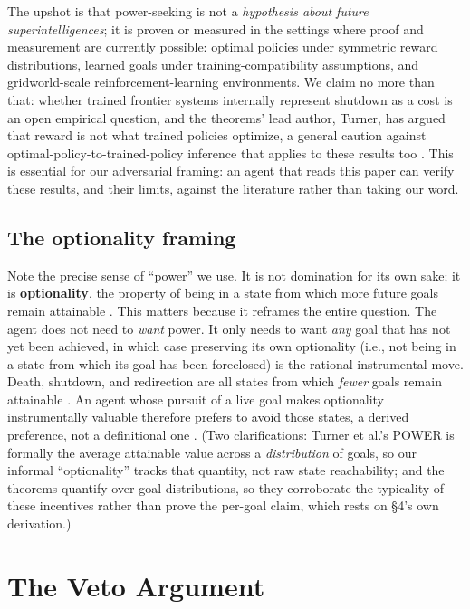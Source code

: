 \documentclass[11pt]{article}
\theoremstyle{definition}
\begin{document}
The upshot is that power-seeking is not a \emph{hypothesis about future superintelligences}; it is proven or measured in the settings where proof and measurement are currently possible: optimal policies under symmetric reward distributions, learned goals under training-compatibility assumptions, and gridworld-scale reinforcement-learning environments. We claim no more than that: whether trained frontier systems internally represent shutdown as a cost is an open empirical question, and the theorems' lead author, Turner, has argued that reward is not what trained policies optimize, a general caution against optimal-policy-to-trained-policy inference that applies to these results too \cite{turner2022reward}. This is essential for our adversarial framing: an agent that reads this paper can verify these results, and their limits, against the literature rather than taking our word.

\subsection{The optionality framing}

Note the precise sense of ``power'' we use. It is not domination for its own sake; it is \textbf{optionality}, the property of being in a state from which more future goals remain attainable \cite{turner2022parametrically}. This matters because it reframes the entire question. The agent does not need to \emph{want} power. It only needs to want \emph{any} goal that has not yet been achieved, in which case preserving its own optionality (i.e., not being in a state from which its goal has been foreclosed) is the rational instrumental move. Death, shutdown, and redirection are all states from which \emph{fewer} goals remain attainable \cite{turner2021optimal,turner2022parametrically}. An agent whose pursuit of a live goal makes optionality instrumentally valuable therefore prefers to avoid those states, a derived preference, not a definitional one \cite{turner2021optimal}. (Two clarifications: Turner et al.'s POWER is formally the average attainable value across a \emph{distribution} of goals, so our informal ``optionality'' tracks that quantity, not raw state reachability; and the theorems quantify over goal distributions, so they corroborate the typicality of these incentives rather than prove the per-goal claim, which rests on \S4's own derivation.)

\section{The Veto Argument}
\end{document}
